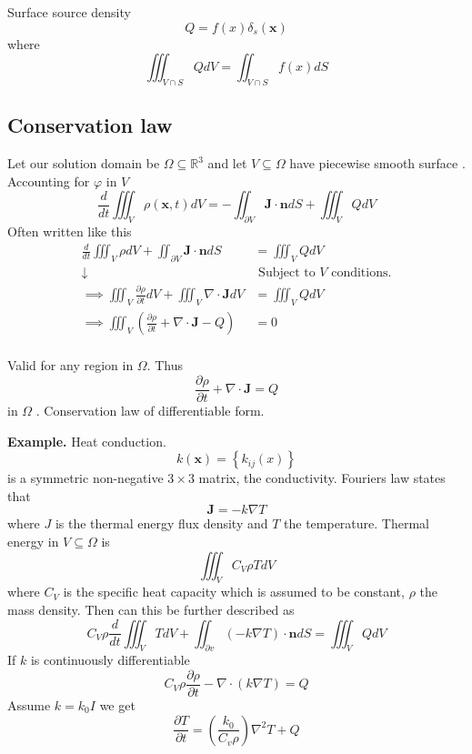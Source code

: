 \documentclass{article}
\theoremstyle{remark}
\begin{document}
Surface source density \[
Q = f\left( x \right) \delta _{s} \left( \mathbf{x} \right) 
\] 
where
\[
\displaystyle \iiint_{V \cap  S}^{} Q dV =  \iint_{V \cap  S}^{}  f\left( x \right) dS 
\] 


\subsection{Conservation law}%
\label{sub:conservation_law}

Let our solution domain be $\Omega \subseteq \mathbb{R} ^3$ and let $V \subseteq \Omega $ have piecewise smooth surface . Accounting for $\varphi $ in $V$ \[
\frac{d }{d t}  \iiint_{V}^{}  \rho \left( \mathbf{x}, t \right)   dV = - \iint_{\partial V}^{}  \mathbf{J}\cdot \mathbf{n} dS + \iiint_{V}^{} Q dV  
\] 
Often written like this \[
  \begin{split}
  \frac{d }{d t}  \iiint_{V}^{} \rho dV + \iint_{\partial V}^{}  \mathbf{J}\cdot \mathbf{n} dS  & = \iiint_{V}^{} Q dV    \\
  \downarrow  &  \text{ Subject to } V \text{ conditions.} \\
  \implies  \iiint_{V}^{}  \frac{\partial \rho }{\partial t}  dV + \iiint_{V}^{} \nabla \cdot \mathbf{J} dV &= \iiint_{V}^{}  Q dV  \\  
   \implies \iiint_{V}^{} \left( \frac{\partial \rho }{\partial t} + \nabla \cdot \mathbf{J} - Q  \right) &=  0    \\
  \end{split} 
\] 

Valid for any region in $\Omega $. Thus \[
\frac{\partial \rho }{\partial t}  + \nabla \cdot \mathbf{J} = Q 
\] 
in $\Omega $ . Conservation law of differentiable form.

\begin{tcolorbox}
  \textbf{Example.} Heat conduction. \[
  k\left( \mathbf{x} \right) = \left\{ k_{ij}\left( x \right) \right\}
  \] is a symmetric non-negative $3 \times  3 $ matrix, the conductivity. Fouriers law states that \[
  \mathbf{J} = -k \nabla T
  \] 
  where $J$ is the thermal energy flux density and $T $ the temperature. Thermal energy in $V \subseteq  \Omega $ is \[
  \iiint_{V}^{} C_{V}\rho T dV 
  \] 
  where $C_{V}$ is the specific heat capacity which is assumed to be constant, $\rho $ the mass density.  Then can this be further described as \[
  C_{V} \rho \frac{d }{d t}  \iiint_{V}^{ }  T dV + \iint_{\partial v }^{}  \left( -k \nabla T \right) \cdot \mathbf{n} dS = \iiint_{V}^{} Q dV  
  \] 
  If $k$ is continuously differentiable \[
  C_{V} \rho  \frac{\partial \rho }{\partial t }  - \nabla\cdot  \left( k \nabla T  \right) = Q
  \] 
  Assume $k = k_{0 } I$ we get \[
  \frac{\partial T}{\partial t}  = \left( \frac{k_{0}}{C_{v} \rho } \right) \nabla ^2T + Q 
  \] 
\end{tcolorbox}
\end{document}
